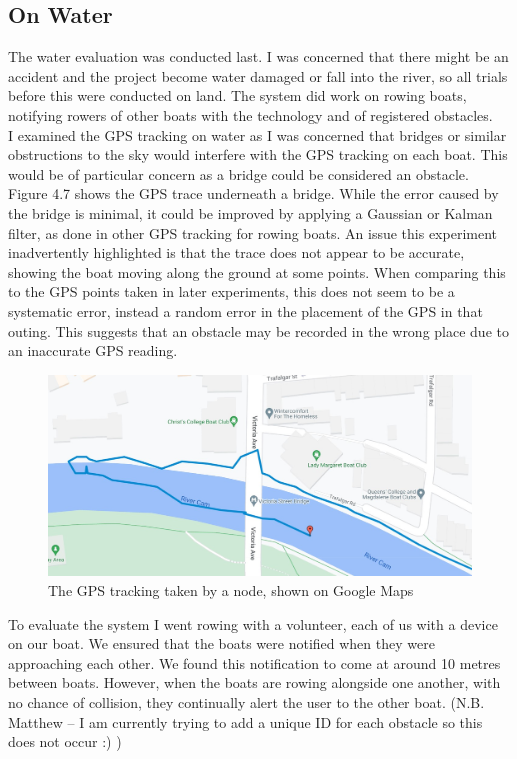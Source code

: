 \documentclass[12pt,a4paper]{report}
\begin{document}
\subsection{On Water} 
The water evaluation was conducted last. I was concerned that there might be an accident and the project become water damaged or fall into the river, so all trials before this were conducted on land. The system did work on rowing boats, notifying rowers of other boats with the technology and of registered obstacles. \\
I examined the GPS tracking on water as I was concerned that bridges or similar obstructions to the sky would interfere with the GPS tracking on each boat. This would be of particular concern as a bridge could be considered an obstacle. Figure 4.7 shows the GPS trace underneath a bridge. While the error caused by the bridge is minimal, it could be improved by applying a Gaussian or Kalman filter, as done in other GPS tracking for rowing boats. An issue this experiment inadvertently highlighted is that the trace does not appear to be accurate, showing the boat moving along the ground at some points. When comparing this to the GPS points taken in later experiments, this does not seem to be a systematic error, instead a random error in the placement of the GPS in that outing. This suggests that an obstacle may be recorded in the wrong place due to an inaccurate GPS reading.
\begin{figure}[h]
\begin{center}
\includegraphics[scale=0.3]{bridgeGPS.jpg}
\end{center}
\caption{The GPS tracking taken by a node, shown on Google Maps \cite{googlemapsgeneral}}
\end{figure}
To evaluate the system I went rowing with a volunteer, each of us with a device on our boat. We ensured that the boats were notified when they were approaching each other. We found this notification to come at around 10 metres between boats. However, when the boats are rowing alongside one another, with no chance of collision, they continually alert the user to the other boat. (N.B. Matthew -- I am currently trying to add a unique ID for each obstacle so this does not occur :) )\\
\end{document}
